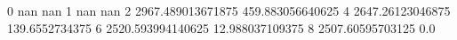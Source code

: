 0 nan nan
1 nan nan
2 2967.489013671875 459.883056640625
4 2647.26123046875 139.6552734375
6 2520.593994140625 12.988037109375
8 2507.60595703125 0.0
